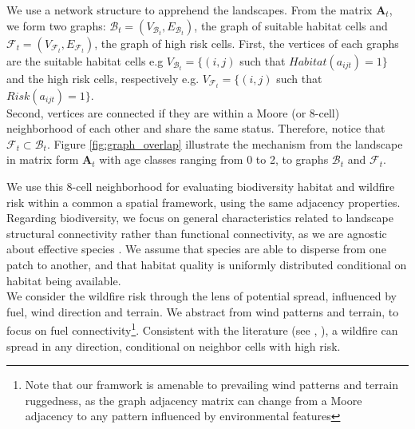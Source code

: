We use a network structure to apprehend the landscapes. From the matrix $\mathbf{A}_t$, we form two graphs:  $\mathcal{B}_t = (V_{\mathcal{B}_t}, E_{\mathcal{B}_t})$, the graph of suitable habitat cells and $\mathcal{F}_t = (V_{\mathcal{F}_t}, E_{\mathcal{F}_t})$, the graph of high risk cells. First, the vertices of each graphs are the suitable habitat cells e.g $
V_{\mathcal{B}_t} = \{(i,j)$ such that $Habitat(a_{ijt})=1\}$ and the high risk cells, respectively e.g. $V_{\mathcal{F}_t} = \{(i,j)$ such that $Risk(a_{ijt})=1\}$.\\
Second, vertices are connected if they are within a Moore (or 8-cell) neighborhood of each other and share the same status. Therefore, notice that $\mathcal{F}_t\subset \mathcal{B}_t$. Figure \ref{fig:graph_overlap} illustrate the mechanism from the landscape in matrix form $\mathbf{A}_t$ with age classes ranging from 0 to 2, to graphs $\mathcal{B}_t$ and $\mathcal{F}_t$.

We use this 8-cell neighborhood for evaluating biodiversity habitat and wildfire risk within a common a spatial framework, using the same adjacency properties. 
Regarding biodiversity, we focus on general characteristics related to landscape structural connectivity rather than functional connectivity, as we are agnostic about effective species \citep{Fahrig2011}. We assume that species are able to disperse from one patch to another, and that habitat quality is uniformly distributed conditional on habitat being available.\\
We consider the wildfire risk through the lens of potential spread, influenced by fuel, wind direction and terrain. We abstract from wind patterns and terrain, to focus on fuel connectivity\footnote{Note that our framwork is amenable to prevailing wind patterns and terrain ruggedness, as the graph adjacency matrix can change from a Moore adjacency to any pattern influenced by environmental features}. Consistent with the literature (see \cite{Peterson_2009}, \cite{pais_cell2fire_2021, gonzalez-olabarria_fire_2023}), a wildfire can spread in any direction, conditional on neighbor cells with high risk. 

